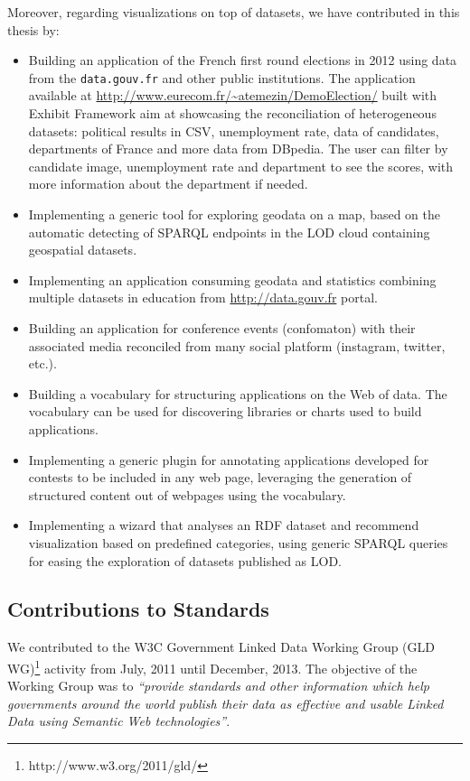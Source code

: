Moreover, regarding visualizations on top of datasets, we have contributed in this thesis by:
\begin{itemize}
\item Building an application of the French first round elections in 2012 using data from the \texttt{data.gouv.fr} and other public institutions. The application available at \url{http://www.eurecom.fr/~atemezin/DemoElection/}  built with Exhibit Framework \cite{exhibit2007} aim at showcasing the reconciliation of heterogeneous datasets: political results in CSV, unemployment rate, data of candidates, departments of France and more data from DBpedia. The user can filter by candidate image, unemployment rate and department to see the scores, with more information about the department if needed.
 
\item Implementing a generic tool for exploring geodata on a map, based on the automatic detecting of SPARQL endpoints in the LOD cloud containing geospatial datasets. 

\item Implementing an application consuming geodata and statistics combining multiple datasets in education from \url{http://data.gouv.fr} portal.

\item Building an application for conference events (confomaton) with their associated media reconciled from many social platform (instagram, twitter, etc.).

\item Building a vocabulary for structuring applications on the Web of data. The vocabulary can be used for discovering libraries or charts used to build applications. 

\item Implementing a generic plugin for annotating applications developed for contests to be included in any web page, leveraging  the generation of structured content out of webpages using the vocabulary. 


\item Implementing a wizard that analyses an RDF dataset and recommend visualization based on predefined categories, using generic SPARQL queries for easing the exploration of datasets published as LOD. 


\end{itemize}

\subsection{Contributions to Standards}
We contributed to the W3C Government Linked Data Working Group (GLD WG)\footnote{http://www.w3.org/2011/gld/} activity from July, 2011 until December, 2013.  The objective of the Working Group was to \textit{``provide standards and other information which help governments around the world publish their data as effective and usable Linked Data using Semantic Web technologies''}.

